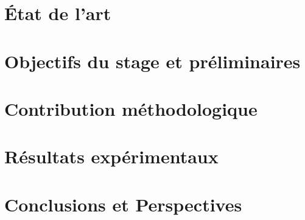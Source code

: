 \documentclass[french]{report}
\begin{document}
    \chapter{État de l'art}
    


    \chapter{Objectifs du stage et préliminaires}
    

    \chapter{Contribution méthodologique}
    


    \chapter{Résultats expérimentaux}
    

    \chapter{Conclusions et Perspectives}
    

    
    

    \appendix

    
\end{document}
